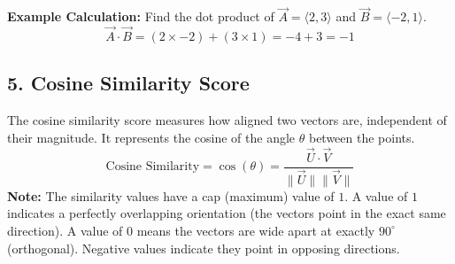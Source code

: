 \documentclass[11pt]{article}
\begin{document}
\textbf{Example Calculation:} Find the dot product of $\vec{A} = \langle 2, 3 \rangle$ and $\vec{B} = \langle -2, 1 \rangle$.
\[ \vec{A} \cdot \vec{B} = (2 \times -2) + (3 \times 1) = -4 + 3 = -1 \]

\subsection*{5. Cosine Similarity Score}
The cosine similarity score measures how aligned two vectors are, independent of their magnitude. It represents the cosine of the angle $\theta$ between the points.
\[ \text{Cosine Similarity} = \cos(\theta) = \frac{\vec{U} \cdot \vec{V}}{\|\vec{U}\| \|\vec{V}\|} \]
\textbf{Note:} The similarity values have a cap (maximum) value of $1$. A value of $1$ indicates a perfectly overlapping orientation (the vectors point in the exact same direction). A value of $0$ means the vectors are wide apart at exactly $90^\circ$ (orthogonal). Negative values indicate they point in opposing directions.
\end{document}
